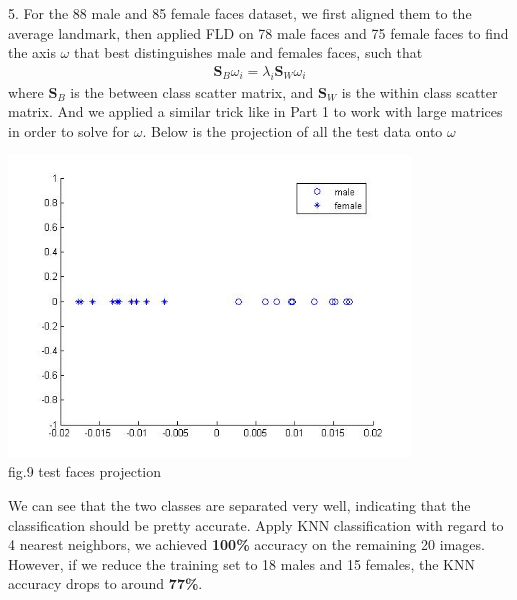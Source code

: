 \documentclass[12pt]{article}
\newenvironment{problem}[2][Part]{\begin{trivlist}
\item[\hskip \labelsep {\bfseries #1}\hskip \labelsep {\bfseries #2}]}{\end{trivlist}}
\begin{document}
\begin{problem}{2. Fisher faces for gender discrimination}
\item{5.}
For the 88 male and 85 female faces dataset, we first aligned them to the average landmark, then applied FLD on 78 male faces and 75 female faces to find the axis $\omega$ that best distinguishes male and females faces, such that
\begin{align*}
		\textbf{S}_B \omega_i = \lambda_i \textbf{S}_W \omega_i
\end{align*}
where $\textbf{S}_B$ is the between class scatter matrix, and $\textbf{S}_W$ is the within class scatter matrix. And we applied a similar trick like in Part 1 to work with large matrices in order to solve for $\omega$. Below is the projection of all the test data onto $\omega$
\begin{center}
	\includegraphics[height=8cm]{projection.jpg}{\\fig.9 test faces projection}
\end{center}
We can see that the two classes are separated very well, indicating that the classification should be pretty accurate. Apply KNN classification with regard to 4 nearest neighbors, we achieved \textbf{100\%} accuracy on the remaining 20 images. However, if we reduce the training set to 18 males and 15 females, the KNN accuracy drops to around \textbf{77\%}.\\


\end{problem}
\end{document}
